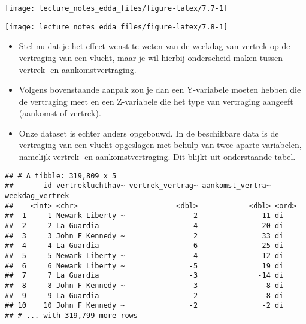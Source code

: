 \documentclass[]{memoir}
\providecommand{\tightlist}{%
  \setlength{\itemsep}{0pt}\setlength{\parskip}{0pt}}
\begin{document}
\texttt{[image: lecture\_notes\_edda\_files/figure-latex/7.7-1]}

\texttt{[image: lecture\_notes\_edda\_files/figure-latex/7.8-1]}

\begin{itemize}
\tightlist
\item
  Stel nu dat je het effect wenst te weten van de weekdag van vertrek op
  de vertraging van een vlucht, maar je wil hierbij onderscheid maken
  tussen vertrek- en aankomstvertraging.
\item
  Volgens bovenstaande aanpak zou je dan een Y-variabele moeten hebben
  die de vertraging meet en een Z-variabele die het type van vertraging
  aangeeft (aankomst of vertrek).
\item
  Onze dataset is echter anders opgebouwd. In de beschikbare data is de
  vertraging van een vlucht opgeslagen met behulp van twee aparte
  variabelen, namelijk vertrek- en aankomstvertraging. Dit blijkt uit
  onderstaande tabel.
\end{itemize}

\begin{verbatim}
## # A tibble: 319,809 x 5
##       id vertrekluchthav~ vertrek_vertrag~ aankomst_vertra~ weekdag_vertrek
##    <int> <chr>                       <dbl>            <dbl> <ord>          
##  1     1 Newark Liberty ~                2               11 di             
##  2     2 La Guardia                      4               20 di             
##  3     3 John F Kennedy ~                2               33 di             
##  4     4 La Guardia                     -6              -25 di             
##  5     5 Newark Liberty ~               -4               12 di             
##  6     6 Newark Liberty ~               -5               19 di             
##  7     7 La Guardia                     -3              -14 di             
##  8     8 John F Kennedy ~               -3               -8 di             
##  9     9 La Guardia                     -2                8 di             
## 10    10 John F Kennedy ~               -2               -2 di             
## # ... with 319,799 more rows
\end{verbatim}
\end{document}
